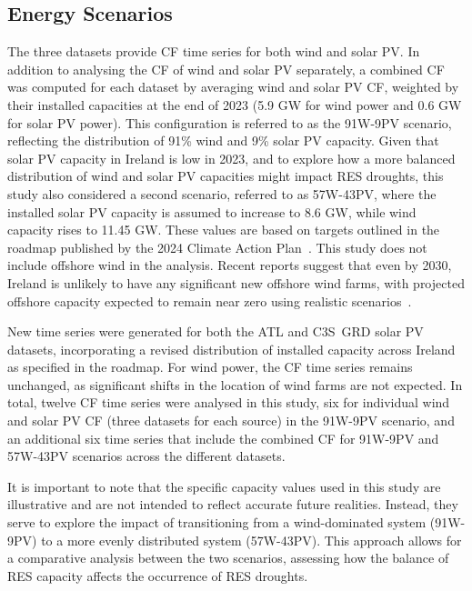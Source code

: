 \documentclass[preprint, 12pt]{elsarticle}
\begin{document}
\subsection{Energy Scenarios}
\label{sec:scenarios}

The three datasets provide CF time series for both wind and solar PV. In addition to analysing the CF of wind and solar PV separately, a combined CF was computed for each dataset by averaging wind and solar PV CF, weighted by their installed capacities at the end of 2023 (5.9 GW for wind power and 0.6 GW for solar PV power). This configuration is referred to as the 91W-9PV scenario, reflecting the distribution of 91\% wind and 9\% solar PV capacity. Given that solar PV capacity in Ireland is low in 2023, and to explore how a more balanced distribution of wind and solar PV capacities might impact RES droughts, this study also considered a second scenario, referred to as 57W-43PV, where the installed solar PV capacity is assumed to increase to 8.6 GW, while wind capacity rises to 11.45 GW. These values are based on targets outlined in the roadmap published by the 2024 Climate Action Plan~\citep{cap2024future}. This study does not include offshore wind in the analysis. Recent reports suggest that even by 2030, Ireland is unlikely to have any significant new offshore wind farms, with projected offshore capacity expected to remain near zero using realistic scenarios~\citep{seai2024future}.

New time series were generated for both the ATL and C3S~GRD solar PV datasets, incorporating a revised distribution of installed capacity across Ireland as specified in the roadmap. For wind power, the CF time series remains unchanged, as significant shifts in the location of wind farms are not expected. In total, twelve CF time series were analysed in this study, six for individual wind and solar PV CF (three datasets for each source) in the 91W-9PV scenario, and an additional six time series that include the combined CF for 91W-9PV and 57W-43PV scenarios across the different datasets.

It is important to note that the specific capacity values used in this study are illustrative and are not intended to reflect accurate future realities. Instead, they serve to explore the impact of transitioning from a wind-dominated system (91W-9PV) to a more evenly distributed system (57W-43PV). This approach allows for a comparative analysis between the two scenarios, assessing how the balance of RES capacity affects the occurrence of RES droughts.
\end{document}
